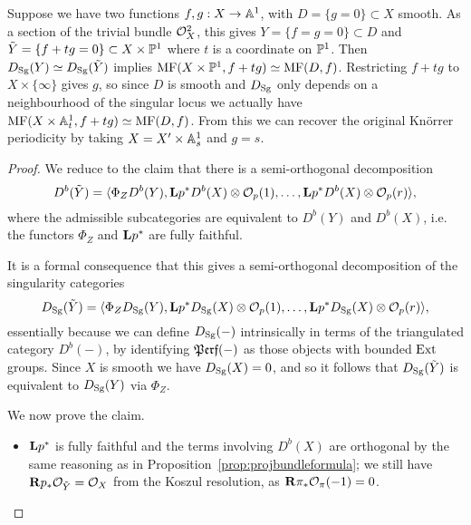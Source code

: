 \begin{example}{}{}
    Suppose we have two functions $f,g:X\to\A^1$, with $D=\{g=0\}\subset X$
    smooth. As a section of the trivial bundle $\O_X^2$, this gives
    $Y=\{f=g=0\}\subset D$ and $\tilde Y=\{f+tg=0\}\subset X\times\P^1$
    where $t$ is a coordinate on $\P^1$. Then $D_\Sg(Y)\simeq D_\Sg(\tilde Y)$
    implies $\MF(X\times\P^1,f+tg)\simeq\MF(D,f)$. Restricting $f+tg$ to
    $X\times\{\infty\}$ gives $g$, so since $D$ is smooth and $D_\Sg$ only
    depends on a neighbourhood of the singular locus we actually have
    $\MF(X\times\A^1_t,f+tg)\simeq\MF(D,f)$. From this we can recover the
    original Kn\"orrer periodicity by taking $X=X'\times\A^1_s$ and $g=s$.
\end{example}

\begin{proof}
    We reduce to the claim that there is a semi-orthogonal decomposition
    \begin{equation*}
        D^b(\tilde Y)
            = \langle\Phi_ZD^b(Y),
                \dL p^*D^b(X)\otimes\O_p(1),\ldots,
                \dL p^*D^b(X)\otimes\O_p(r)\rangle,
    \end{equation*}
    where the admissible subcategories are equivalent to $D^b(Y)$ and $D^b(X)$,
    i.e. the functors $\Phi_Z$ and $\dL p^*$ are fully faithful.

    It is a formal consequence that this gives a semi-orthogonal decomposition
    of the singularity categories
    \begin{equation*}
        D_\Sg(\tilde Y)
            = \langle\Phi_ZD_\Sg(Y),
                \dL p^*D_\Sg(X)\otimes\O_p(1),\ldots,
                \dL p^*D_\Sg(X)\otimes\O_p(r)\rangle,
    \end{equation*}
    essentially because we can define $D_\Sg(-)$ intrinsically in terms of the
    triangulated category $D^b(-)$, by identifying $\DPerf(-)$ as those objects
    with bounded $\Ext$ groups. Since $X$ is smooth we have $D_\Sg(X)=0$, and so
    it follows that $D_\Sg(\tilde Y)$ is equivalent to $D_\Sg(Y)$ via $\Phi_Z$.

    We now prove the claim.
    \begin{itemize}
        \item $\dL p^*$ is fully faithful and the terms involving $D^b(X)$ are
            orthogonal by the same reasoning as in
            Proposition~\ref{prop:projbundleformula}; we still have
            $\dR p_*\O_{\tilde Y}=\O_X$ from the Koszul resolution, as
            $\dR\pi_*\O_\pi(-1)=0$.


\end{itemize}
\end{proof}
